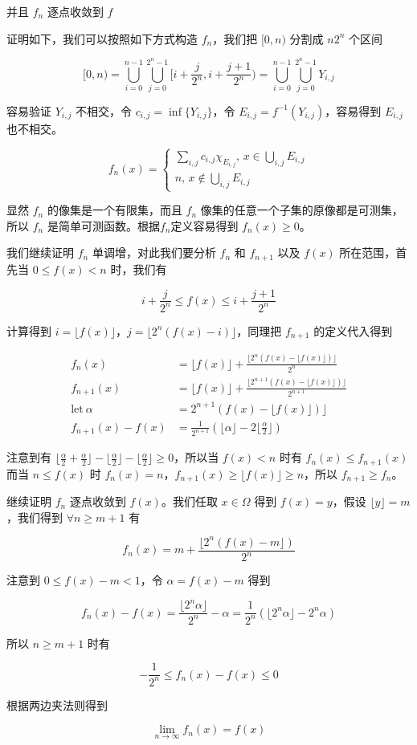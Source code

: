 并且 $f_n$ 逐点收敛到 $f$

证明如下，我们可以按照如下方式构造 $f_n$，我们把 $[0,n)$ 分割成 $n2^n$ 个区间 

\[
[0,n) = \bigcup_{i=0}^{n-1} \bigcup_{j=0}^{2^n-1} [i+\frac{j}{2^n}, i+\frac{j+1}{2^n}) = \bigcup_{i=0}^{n-1}\bigcup_{j=0}^{2^n-1}Y_{i,j}
\]

容易验证 $Y_{i,j}$ 不相交，令 $c_{i,j} = \inf \{ Y_{i,j}  \}$，令
$E_{i,j} = f^{-1}(Y_{i,j})$，容易得到 $E_{i,j}$  也不相交。

\[
f_n(x) = \begin{cases}
    \sum_{i,j}c_{i,j}\chi_{E_{i,j}} ,\, x \in \bigcup_{i,j}E_{i,j} \\
    n ,\, x \notin \bigcup_{i,j}E_{i,j}
\end{cases}
\]

显然 $f_n$ 的像集是一个有限集，而且 $f_n$ 像集的任意一个子集的原像都是可测集，所以 $f_n$ 是简单可测函数。根据$f_n$定义容易得到 $f_n(x) \ge 0$。

我们继续证明 $f_n$ 单调增，对此我们要分析 $f_n$ 和 $f_{n+1}$ 以及 $f(x)$ 所在范围，首先当 $0 \le f(x) < n$ 时，我们有

\[
i + \frac{j}{2^n} \le f(x) \le i + \frac{j+1}{2^n}
\]

计算得到 $i = \lfloor f(x)\rfloor$，$j = \lfloor 2^n(f(x) - i) \rfloor $，同理把 $f_{n+1}$ 的定义代入得到

\begin{align*}
    f_n(x) & = \lfloor f(x)\rfloor + \frac{\lfloor 2^n(f(x) - \lfloor f(x) \rfloor) \rfloor}{2^n} \\
    f_{n+1}(x) &= \lfloor f(x)\rfloor + \frac{\lfloor 2^{n+1}(f(x) - \lfloor f(x)\rfloor) \rfloor}{2^{n+1}} \\
    \text{let}\: \alpha & = 2^{n+1}(f(x) - \lfloor f(x) \rfloor) \rfloor \\
    f_{n+1}(x) - f(x) &= \frac{1}{2^{n+1}}( \lfloor \alpha \rfloor -   2\lfloor \frac{\alpha}{2} \rfloor)
\end{align*}


注意到有 $\lfloor \frac{\alpha}{2} + \frac{\alpha}{2}  \rfloor -   \lfloor \frac{\alpha}{2} \rfloor - \lfloor \frac{\alpha}{2} \rfloor \ge 0$，所以当 $f(x) < n$ 时有 $f_n(x) \le f_{n+1}(x)$
而当 $n \le f(x) $ 时 $f_n(x) = n$，$f_{n+1}(x) \ge \lfloor f(x)\rfloor \ge n$，所以 $f_{n+1} \ge f_n$。

继续证明 $f_n$ 逐点收敛到 $f(x)$。我们任取 $x \in \Omega$ 得到 $f(x) = y$，假设 $\lfloor y \rfloor = m$，我们得到 $\forall n \ge m + 1$ 有

\[
f_n(x) = m + \frac{\lfloor 2^n(f(x) - m \rfloor)}{2^n} 
\]

注意到 $0 \le f(x) -m < 1$，令 $\alpha = f(x) -m$ 得到

\[
f_n(x) -f(x) =\frac{\lfloor 2^n \alpha \rfloor}{2^n} - \alpha  = \frac{1}{2^n} (\lfloor2^n \alpha \rfloor-2^n\alpha)
\]

所以 $n \ge m + 1$ 时有

\[
- \frac{1}{2^n}\le f_n(x) -f(x) \le 0
\]

根据两边夹法则得到 

\[
\lim_{n \to \infty}f_n(x) = f(x)
\]


